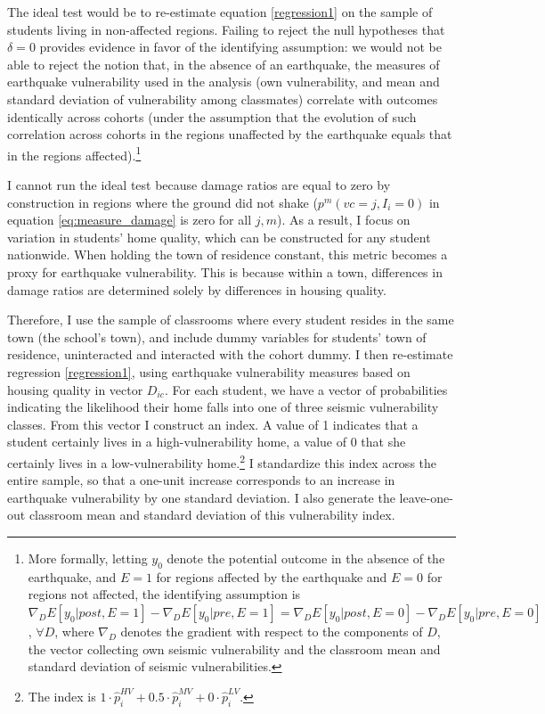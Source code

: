 The ideal test would be to re-estimate equation \eqref{regression1} on the sample of students living in non-affected regions. Failing to reject the null hypotheses that $\delta=0$ provides evidence in favor of the identifying assumption: we would not be able to reject the notion that, in the absence of an earthquake, the measures of earthquake vulnerability used in the analysis (own vulnerability, and mean and standard deviation of vulnerability among classmates) correlate with outcomes identically across cohorts (under the assumption that the evolution of such correlation across cohorts in the regions unaffected by the earthquake equals that in the regions affected).\footnote{More formally, letting $y_{0}$ denote the potential outcome in the absence of the earthquake, and $E=1$ for regions affected by the earthquake and $E=0$ for regions not affected, the identifying assumption is $\nabla_{D} E[y_0|post,E=1]-\nabla_{D}E[y_0|pre,E=1]=\nabla_{D}E[y_0| post,E=0]-\nabla_{D}E[y_0|pre,E=0]$, $\forall D$, where $\nabla_{D}$ denotes the gradient with respect to the components of $D$, the vector collecting own seismic vulnerability and the classroom mean and standard deviation of seismic vulnerabilities. }\par 

I cannot run the ideal test because damage ratios are equal to zero by construction in regions where the ground did not shake ($p^m(vc=j,I_i=0)$ in equation \eqref{eq:measure_damage} is zero for all $j,m$). As a result, I focus on variation in students' home quality, which can be constructed for any student nationwide. When holding the town of residence constant, this metric becomes a proxy for earthquake vulnerability. This is because within a town, differences in damage ratios are determined solely by differences in housing quality.\par 
Therefore, I use the sample of classrooms where every student resides in the same town (the school's town), and include dummy variables for students' town of residence, uninteracted and interacted with the cohort dummy. I then re-estimate regression \eqref{regression1}, using earthquake vulnerability measures based on housing quality in vector $D_{ic}$. For each student, we have a vector of probabilities indicating the likelihood their home falls into one of three seismic vulnerability classes. From this vector I construct an index. A value of 1 indicates that a student certainly lives in a high-vulnerability home, a value of 0 that she certainly lives in a low-vulnerability home.\footnote{The index is $1 \cdot \hat{p}_i^{HV} + 0.5 \cdot  \hat{p}_i^{MV} + 0 \cdot \hat{p}_i^{LV}$.} I standardize this index across the entire sample, so that a one-unit increase corresponds to an increase in earthquake vulnerability by one standard deviation. I also generate the leave-one-out classroom mean and standard deviation of this vulnerability index. \par 

